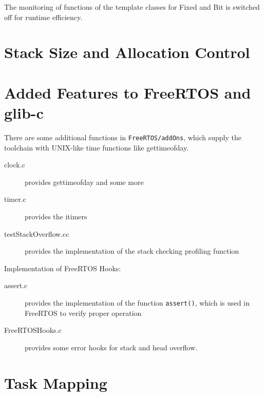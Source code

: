 \begin{enumerate}
The monitoring of functions of the template classes for Fixed and Bit 
is switched off for runtime efficiency.

\section{Stack Size and Allocation Control}
%

\section{Added Features to FreeRTOS and glib-c}
There are some additional functions in \texttt{FreeRTOS/addOns},
 which supply the toolchain
with UNIX-like time functions like gettimeofday.
\begin{description}
\item[clock.c]provides gettimeofday and some more
\item[timer.c] provides the itimers
\item[testStackOverflow.cc] provides the implementation of the 
  stack checking profiling function
\end{description}

Implementation of FreeRTOS Hooks:
\begin{description}
\item[assert.c] provides the implementation of the function
  \texttt{assert()}, which is used in FreeRTOS to verify
  proper operation
\item[FreeRTOSHooks.c] provides some error hooks for stack and head overflow.
\end{description}

\section{Task Mapping}


\end{enumerate}
